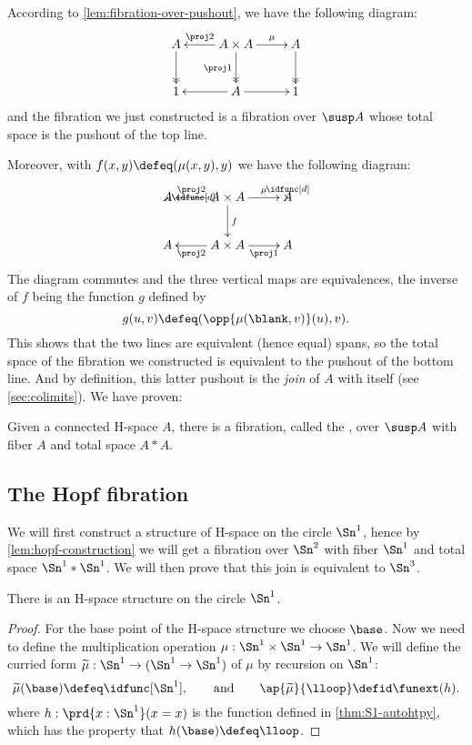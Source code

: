 {According to \cref{lem:fibration-over-pushout}, we have the following
diagram:
%
\[\xymatrix{A \ar@{->>}[d] & A \times A \ar[l]_-{\proj2} \ar@{->>}_{\proj1}[d]
  \ar[r]^-{\mu} & A \ar@{->>}[d] \\
  1 & A \ar[r] \ar[l] & 1}\]
%
and the fibration we just constructed is a fibration over $\susp A$ whose total
space is the pushout of the top line.

Moreover, with $f(x,y)\defeq(\mu(x,y),y)$ we have the following diagram:
%
\[\xymatrix{A \ar_\idfunc[d] & A \times A \ar[l]_-{\proj2} \ar^f[d]
  \ar[r]^-{\mu} & A \ar^\idfunc[d] \\
  A & A\times A \ar^-{\proj2}[l] \ar_-{\proj1}[r] & A}\]
%
The diagram commutes and the three vertical maps are equivalences, the inverse
of $f$ being the function $g$ defined by
\[g(u,v)\defeq(\opp{\mu(\blank,v)}(u),v).\]
%
This shows that the two lines are equivalent (hence equal) spans, so the total
space of the fibration we constructed is equivalent to the pushout of the bottom
line.
And by definition, this latter pushout is the \emph{join} of $A$ with itself (see \cref{sec:colimits}).
%
We have proven:

\begin{lem}\label{lem:hopf-construction}
  Given a connected H-space $A$, there is a fibration, called the
  ,
  over $\susp A$ with fiber $A$ and total space $A*A$.
\end{lem}

\subsection{The Hopf fibration}

We will first construct a structure of H-space on the circle $\Sn^1$, hence by
\cref{lem:hopf-construction} we will get a fibration over $\Sn^2$ with fiber
$\Sn^1$ and total space $\Sn^1*\Sn^1$. We will then prove that this join is
equivalent to $\Sn^3$.

\begin{lem}\label{lem:hspace-S1}
  There is an H-space structure on the circle $\Sn^1$.
\end{lem}
\begin{proof}
  For the base point of the H-space structure we choose $\base$.
  Now we need to define the multiplication operation
  $\mu:\Sn^1\times\Sn^1\to\Sn^1$.
  We will define the curried form $\widetilde\mu:\Sn^1\to(\Sn^1\to\Sn^1)$ of $\mu$
  by recursion on $\Sn^1$:
  \begin{equation*}
    \widetilde\mu(\base) \defeq\idfunc[\Sn^1],
    \qquad\text{and}\qquad
    \ap{\widetilde\mu}{\lloop} \defid\funext(h).
  \end{equation*}
  where $h:\prd{x:\Sn^1}(x=x)$ is the function defined in \cref{thm:S1-autohtpy},
  which has the property that $h(\base) \defeq\lloop$.


\end{proof}}
